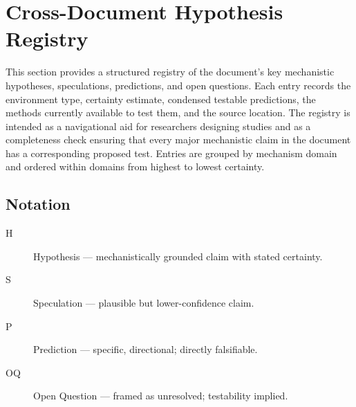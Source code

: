 %
%

\section{Cross-Document Hypothesis Registry}
\label{sec:hypothesis-registry}

\begin{chapterabstract}
This section provides a structured registry of the document's key mechanistic
hypotheses, speculations, predictions, and open questions.  Each entry records
the environment type, certainty estimate, condensed testable predictions, the
methods currently available to test them, and the source location.  The registry
is intended as a navigational aid for researchers designing studies and as a
completeness check ensuring that every major mechanistic claim in the document
has a corresponding proposed test.  Entries are grouped by mechanism domain and
ordered within domains from highest to lowest certainty.
\end{chapterabstract}

\subsection*{Notation}

\begin{description}
  \item[H] Hypothesis --- mechanistically grounded claim with stated certainty.
  \item[S] Speculation --- plausible but lower-confidence claim.
  \item[P] Prediction --- specific, directional; directly falsifiable.
  \item[OQ] Open Question --- framed as unresolved; testability implied.
\end{description}

